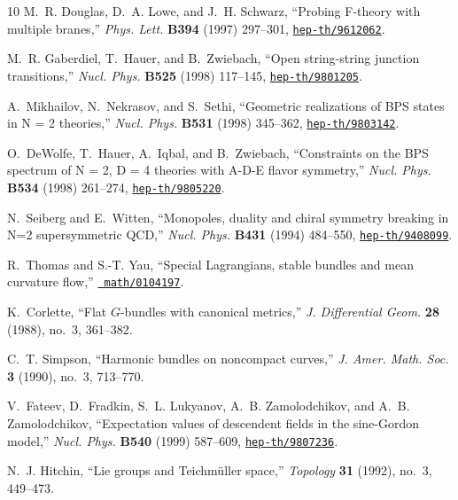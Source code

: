 \begin{thebibliography}{10}
M.~R. Douglas, D.~A. Lowe, and J.~H. Schwarz, ``{Probing F-theory with multiple
  branes},'' {\em Phys. Lett.} {\bf B394} (1997) 297--301,
\href{http://www.arXiv.org/abs/hep-th/9612062}{{\tt hep-th/9612062}}.

M.~R. Gaberdiel, T.~Hauer, and B.~Zwiebach, ``{Open string-string junction
  transitions},'' {\em Nucl. Phys.} {\bf B525} (1998) 117--145,
\href{http://www.arXiv.org/abs/hep-th/9801205}{{\tt hep-th/9801205}}.

A.~Mikhailov, N.~Nekrasov, and S.~Sethi, ``{Geometric realizations of BPS
  states in N = 2 theories},'' {\em Nucl. Phys.} {\bf B531} (1998) 345--362,
\href{http://www.arXiv.org/abs/hep-th/9803142}{{\tt hep-th/9803142}}.

O.~DeWolfe, T.~Hauer, A.~Iqbal, and B.~Zwiebach, ``{Constraints on the BPS
  spectrum of N = 2, D = 4 theories with A-D-E flavor symmetry},'' {\em Nucl.
  Phys.} {\bf B534} (1998) 261--274,
\href{http://www.arXiv.org/abs/hep-th/9805220}{{\tt hep-th/9805220}}.

N.~Seiberg and E.~Witten, ``{Monopoles, duality and chiral symmetry breaking in
  N=2 supersymmetric QCD},'' {\em Nucl. Phys.} {\bf B431} (1994) 484--550,
\href{http://www.arXiv.org/abs/hep-th/9408099}{{\tt hep-th/9408099}}.

R.~Thomas and S.-T. Yau, ``{S}pecial {L}agrangians, stable bundles and mean
  curvature flow,'' \href{http://www.arXiv.org/abs/math/0104197}{{\tt
  math/0104197}}.

K.~Corlette, ``Flat {$G$}-bundles with canonical metrics,'' {\em J.
  Differential Geom.} {\bf 28} (1988), no.~3, 361--382.

C.~T. Simpson, ``Harmonic bundles on noncompact curves,'' {\em J. Amer. Math.
  Soc.} {\bf 3} (1990), no.~3, 713--770.

V.~Fateev, D.~Fradkin, S.~L. Lukyanov, A.~B. Zamolodchikov, and A.~B.
  Zamolodchikov, ``{Expectation values of descendent fields in the sine-Gordon
  model},'' {\em Nucl. Phys.} {\bf B540} (1999) 587--609,
\href{http://www.arXiv.org/abs/hep-th/9807236}{{\tt hep-th/9807236}}.

N.~J. Hitchin, ``Lie groups and {T}eichm\"uller space,'' {\em Topology} {\bf
  31} (1992), no.~3, 449--473.


\end{thebibliography}
